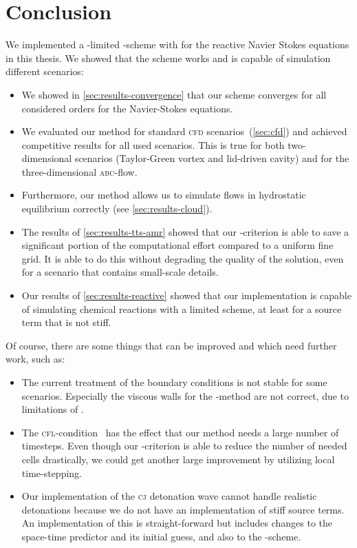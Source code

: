 \chapter{Conclusion}\label{chap:conclusion}
We implemented a \muscl{}-limited \aderdg{}-scheme with \amr{} for the reactive Navier Stokes equations in this thesis.
We showed that the scheme works and is capable of simulation different scenarios:
\begin{itemize}
\item We showed in \cref{sec:results-convergence} that our scheme converges for all considered orders for the Navier-Stokes equations.
\item We evaluated our method for standard \textsc{cfd} scenarios~(\cref{sec:cfd}) and achieved competitive results for all used scenarios.
  This is true for both two-dimensional scenarios (Taylor-Green vortex and lid-driven cavity) and for the three-dimensional \textsc{abc}-flow.
\item Furthermore, our method allows us to simulate flows in hydrostatic equilibrium correctly (see \cref{sec:results-cloud}).
\item The results of \cref{sec:results-tts-amr} showed that our \amr{}-criterion is able to save a significant portion of the computational effort compared to a uniform fine grid.
  It is able to do this without degrading the quality of the solution, even for a scenario that contains small-scale details.
\item Our results of \cref{sec:results-reactive} showed that our implementation is capable of simulating chemical reactions with a limited scheme, at least for a source term that is not stiff.
\end{itemize}

Of course, there are some things that can be improved and which need further work, such as:
\begin{itemize}
\item The current treatment of the boundary conditions is not stable for some scenarios.
  Especially the viscous walls for the \muscl{}-method are not correct, due to limitations of \exahype{}.
\item The \textsc{cfl}-condition~ has the effect that our method needs a large number of timesteps.
  Even though our \amr{}-criterion is able to reduce the number of needed cells drastically, we could get another large improvement by utilizing local time-stepping.
\item Our implementation of the \textsc{cj} detonation wave cannot handle realistic detonations because we do not have an implementation of stiff source terms.
  An implementation of this is straight-forward but includes changes to the space-time predictor and its initial guess, and also to the \muscl{}-scheme.
\end{itemize}

